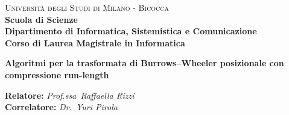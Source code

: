 \documentclass[a4paper,12pt, oneside]{book}
\begin{document}
{} 
\begin{titlepage}
  

  \noindent
  \begin{minipage}[t]{0.19\textwidth}
  \end{minipage}
  \begin{minipage}[t]{0.81\textwidth}
    {
      {\textsc{Università degli Studi di Milano - Bicocca}} \\
      \textbf{Scuola di Scienze} \\
      \textbf{Dipartimento di Informatica, Sistemistica e Comunicazione} \\
      \textbf{Corso di Laurea Magistrale in Informatica} \\
      \par
    }
  \end{minipage}
  
  \vspace{40mm}
  
  \begin{center}
    {\LARGE{
        \textbf{Algoritmi per la trasformata di\vspace{1mm}}}}
    \vspace{1mm}
    {\LARGE{
        \textbf{Burrows--Wheeler posizionale con}}}
    \vspace{1mm}
    {\LARGE{
        \textbf{compressione run-length}}}
    
  \end{center}
  
  \vspace{48mm}

  \noindent
  {\large \textbf{Relatore:} \textit{Prof.ssa~Raffaella Rizzi}} \\

  \noindent
  {\large \textbf{Correlatore:} \textit{Dr.~Yuri Pirola}}
  

\end{titlepage}
\end{document}
